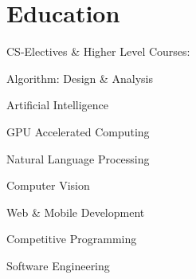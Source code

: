 \documentclass[]{m abbas resume' 2022}
\begin{document}
\begin{minipage}[t]{0.50\textwidth}



	\section{Education}
	 
	CS-Electives \& Higher Level Courses:
	\vspace{0.23cm}
	\begin{tightemize}
		\item Algorithm: Design \& Analysis
		\item Artificial Intelligence
		\item GPU Accelerated Computing
		\item Natural Language Processing
		\item Computer Vision
		\item Web \& Mobile Development
		\item Competitive Programming
		\item Software Engineering
	\end{tightemize}

	\sectionsep

\end{minipage}
\end{document}
